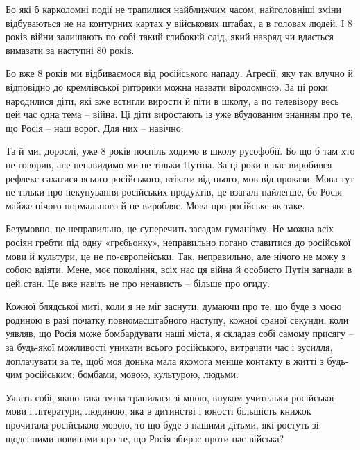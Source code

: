 Бо які б карколомні події не трапилися найближчим часом, найголовніші зміни
відбуваються не на контурних картах у військових штабах, а в головах людей. І 8
років війни залишають по собі такий глибокий слід, який навряд чи вдасться
вимазати за наступні 80 років.

Бо вже 8 років ми відбиваємося від російського нападу. Агресії, яку так влучно
й відповідно до кремлівської риторики можна назвати віроломною. За ці роки
народилися діти, які вже встигли вирости й піти в школу, а по телевізору весь
цей час одна тема – війна. Ці діти виростають із уже вбудованим знанням про те,
що Росія – наш ворог. Для них – навічно.

Та й ми, дорослі, уже 8 років поспіль ходимо в школу русофобії. Бо що б там хто
не говорив, але ненавидимо ми не тільки Путіна. За ці роки в нас виробився
рефлекс сахатися всього російського, втікати від нього, мов від прокази. Мова
тут не тільки про некупування російських продуктів, це взагалі найлегше, бо
Росія майже нічого нормального й не виробляє. Мова про російське як таке.

Безумовно, це неправильно, це суперечить засадам гуманізму. Не можна всіх
росіян гребти під одну «грєбьонку», неправильно погано ставитися до російської
мови й культури, це не по-європейськи. Так, неправильно, але нічого не можу з
собою вдіяти. Мене, моє покоління, всіх нас ця війна й особисто Путін загнали в
цей стан. Це вже навіть не про ненависть – більше про огиду.

Кожної блядської миті, коли я не міг заснути, думаючи про те, що буде з моєю
родиною в разі початку повномасштабного наступу, кожної сраної секунди, коли
уявляв, що Росія може бомбардувати наші міста, я складав собі самому присягу –
за будь-якої можливості уникати всього російського, витрачати час і зусилля,
доплачувати за те, щоб моя донька мала якомога менше контакту в житті з
будь-чим російським: бомбами, мовою, культурою, людьми.

Уявіть собі, якщо така зміна трапилася зі мною, внуком учительки російської
мови і літератури, людиною, яка в дитинстві і юності більшість книжок прочитала
російською мовою, то що буде з нашими дітьми, які ростуть зі щоденними новинами
про те, що Росія збирає проти нас війська?
 
